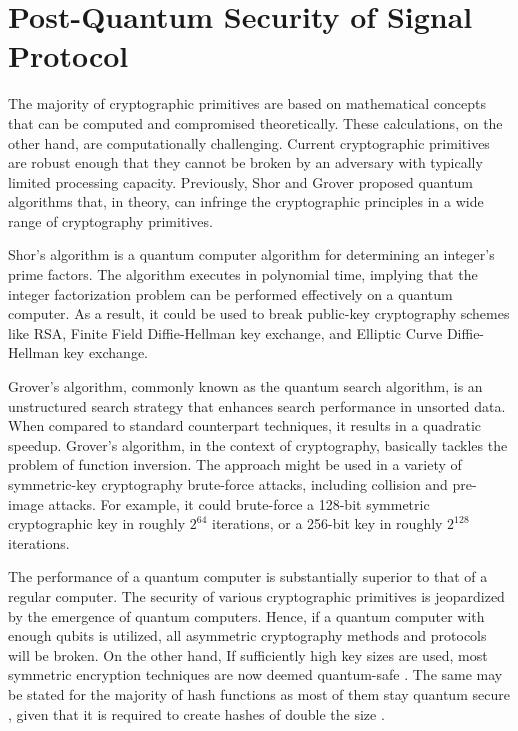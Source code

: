 \section{Post-Quantum Security of Signal Protocol}
The majority of cryptographic primitives are based on mathematical concepts that can be computed and compromised theoretically. These calculations, on the other hand, are computationally challenging. Current cryptographic primitives are robust enough that they cannot be broken by an adversary with typically limited processing capacity. Previously, Shor \cite{shor94} and Grover \cite{gro96} proposed quantum algorithms that, in theory, can infringe the cryptographic principles in a wide range of cryptography primitives.
\par
Shor's algorithm is a quantum computer algorithm for determining an integer's prime factors. The algorithm executes in polynomial time, implying that the integer factorization problem can be performed effectively on a quantum computer. As a result, it could be used to break public-key cryptography schemes like RSA, Finite Field Diffie-Hellman key exchange, and Elliptic Curve Diffie-Hellman key exchange.
\par
Grover's algorithm, commonly known as the quantum search algorithm, is an unstructured search strategy that enhances search performance in unsorted data. When compared to standard counterpart techniques, it results in a quadratic speedup. Grover's algorithm, in the context of cryptography, basically tackles the problem of function inversion. The approach might be used in a variety of symmetric-key cryptography brute-force attacks, including collision and pre-image attacks. For example, it could brute-force a 128-bit symmetric cryptographic key in roughly $ 2^{64} $ iterations, or a 256-bit key in roughly $ 2^{128} $ iterations.
\par
The performance of a quantum computer is substantially superior to that of a regular computer. The security of various cryptographic primitives is jeopardized by the emergence of quantum computers. Hence, if a quantum computer with enough qubits is utilized, all asymmetric cryptography methods and protocols will be broken. On the other hand, If sufficiently high key sizes are used, most symmetric encryption techniques are now deemed quantum-safe \cite{essay77239}. The same may be stated for the majority of hash functions as most of them stay quantum secure \cite{ber09}, given that it is required to create hashes of double the size \cite{bra+98}.
\par

